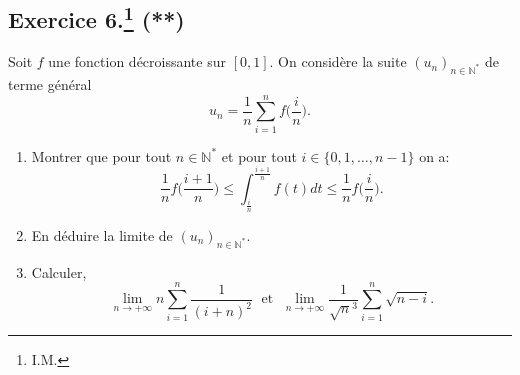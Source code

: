 \documentclass[a4paper]{article}
\begin{document}
\subsection*{Exercice 6.\footnote{I.M.} (**)}
Soit $f$ une fonction décroissante sur $[0,1]$. On considère la suite $(u_n)_{n\in\mathbb{N}^*}$ de terme général $$u_n=\frac{1}{n}\sum_{i=1}^nf\Big(\frac{i}{n}\Big).$$
\begin{enumerate}
	\item Montrer que pour tout $n\in\mathbb{N}^*$ et pour tout $i\in\{0,1,\ldots,n-1\}$ on a:  \[
			\frac{1}{n}f\Big(\frac{i+1}{n}\Big)\leq\int_{\frac{i}{n}}^{\frac{i+1}{n}}f(t)dt\leq\frac{1}{n}f\Big(\frac{i}{n}\Big)
		.\] 
	\item En déduire la limite de $(u_n)_{n\in\mathbb{N}^*}$.
\item Calculer,
	\[
		\lim_{n\to+\infty}n\sum_{i=1}^n\frac{1}{(i+n)^2}\; \text{ et } \; \lim_{n\to+\infty}\frac{1}{\sqrt{n}^3}\sum_{i=1}^{n}\sqrt{n-i}
	.\] 
\end{enumerate}
\end{document}
